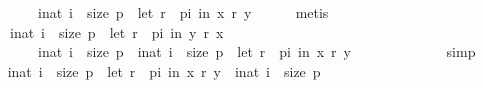 \begin{isabellebody}
\ \ \ \ \ \ \ \ {\isacharbraceleft}{\kern0pt}i{\isacharcolon}{\kern0pt}{\isacharcolon}{\kern0pt}nat{\isachardot}{\kern0pt}\ i\ {\isacharless}{\kern0pt}\ size\ p\ {\isasymand}\ {\isacharparenleft}{\kern0pt}let\ r\ {\isacharequal}{\kern0pt}\ {\isacharparenleft}{\kern0pt}p{\isacharbang}{\kern0pt}i{\isacharparenright}{\kern0pt}\ in\ {\isacharparenleft}{\kern0pt}x\ {\isasympreceq}\isactrlsub r\ y{\isacharparenright}{\kern0pt}{\isacharparenright}{\kern0pt}{\isacharbraceright}{\kern0pt}{\isachardoublequoteclose}\isanewline
\ \ \ \ \isamarkupfalse%
\ metis\isanewline
\ \ \isamarkupfalse%
\ {}{}{\isacharcolon}{\kern0pt}\isanewline
\ \ \ \ {\isachardoublequoteopen}{\isacharbraceleft}{\kern0pt}i{\isacharcolon}{\kern0pt}{\isacharcolon}{\kern0pt}nat{\isachardot}{\kern0pt}\ i\ {\isacharless}{\kern0pt}\ size\ p\ {\isasymand}\ {\isacharparenleft}{\kern0pt}let\ r\ {\isacharequal}{\kern0pt}\ {\isacharparenleft}{\kern0pt}p{\isacharbang}{\kern0pt}i{\isacharparenright}{\kern0pt}\ in\ {\isacharparenleft}{\kern0pt}y\ {\isasympreceq}\isactrlsub r\ x{\isacharparenright}{\kern0pt}{\isacharparenright}{\kern0pt}{\isacharbraceright}{\kern0pt}\ {\isacharequal}{\kern0pt}\isanewline
\ \ \ \ \ \ \ \ {\isacharbraceleft}{\kern0pt}i{\isacharcolon}{\kern0pt}{\isacharcolon}{\kern0pt}nat{\isachardot}{\kern0pt}\ i\ {\isacharless}{\kern0pt}\ size\ p{\isacharbraceright}{\kern0pt}\ {\isacharminus}{\kern0pt}\ {\isacharbraceleft}{\kern0pt}i{\isacharcolon}{\kern0pt}{\isacharcolon}{\kern0pt}nat{\isachardot}{\kern0pt}\ i\ {\isacharless}{\kern0pt}\ size\ p\ {\isasymand}\ {\isacharparenleft}{\kern0pt}let\ r\ {\isacharequal}{\kern0pt}\ {\isacharparenleft}{\kern0pt}p{\isacharbang}{\kern0pt}i{\isacharparenright}{\kern0pt}\ in\ {\isacharparenleft}{\kern0pt}x\ {\isasympreceq}\isactrlsub r\ y{\isacharparenright}{\kern0pt}{\isacharparenright}{\kern0pt}{\isacharbraceright}{\kern0pt}{\isachardoublequoteclose}\isanewline
\ \ \ \ \isamarkupfalse%
\ {\isachardoublequoteopen}{}{}{\isachardoublequoteclose}\ {\isachardoublequoteopen}{}{\isachardoublequoteclose}\isanewline
\ \ \ \ \isamarkupfalse%
\ simp\isanewline
\ \ \isamarkupfalse%
\ {\isachardoublequoteopen}{\isacharbraceleft}{\kern0pt}i{\isacharcolon}{\kern0pt}{\isacharcolon}{\kern0pt}nat{\isachardot}{\kern0pt}\ i\ {\isacharless}{\kern0pt}\ size\ p\ {\isasymand}\ {\isacharparenleft}{\kern0pt}let\ r\ {\isacharequal}{\kern0pt}\ {\isacharparenleft}{\kern0pt}p{\isacharbang}{\kern0pt}i{\isacharparenright}{\kern0pt}\ in\ {\isacharparenleft}{\kern0pt}x\ {\isasympreceq}\isactrlsub r\ y{\isacharparenright}{\kern0pt}{\isacharparenright}{\kern0pt}{\isacharbraceright}{\kern0pt}\ {\isasymsubseteq}\ {\isacharbraceleft}{\kern0pt}i{\isacharcolon}{\kern0pt}{\isacharcolon}{\kern0pt}nat{\isachardot}{\kern0pt}\ i\ {\isacharless}{\kern0pt}\ size\ p{\isacharbraceright}{\kern0pt}{\isachardoublequoteclose}\isanewline

\end{isabellebody}
